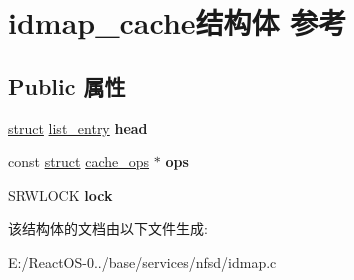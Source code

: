 \hypertarget{structidmap__cache}{}\section{idmap\+\_\+cache结构体 参考}
\label{structidmap__cache}
\subsection*{Public 属性}
\begin{DoxyCompactItemize}
\item 
\mbox{\label{structidmap__cache_a35f5ce30d4a0f698b2a597e65c295525}} 
\hyperlink{interfacestruct}{struct} \hyperlink{structlist__entry}{list\+\_\+entry} {\bfseries head}
\item 
\mbox{\label{structidmap__cache_a97b2323ce3648dd99c50195bc5bcb614}} 
const \hyperlink{interfacestruct}{struct} \hyperlink{structcache__ops}{cache\+\_\+ops} $\ast$ {\bfseries ops}
\item 
\mbox{\label{structidmap__cache_a3a32ad4a403d7712cac85155420d22c8}} 
S\+R\+W\+L\+O\+CK {\bfseries lock}
\end{DoxyCompactItemize}


该结构体的文档由以下文件生成\+:\begin{DoxyCompactItemize}
\item 
E\+:/\+React\+O\+S-\/0../base/services/nfsd/idmap.\+c\end{DoxyCompactItemize}
